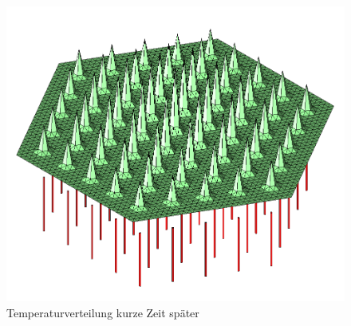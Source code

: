 \documentclass[12pt,a4paper]{article}
\begin{document}
\begin{figure}[h]
\begin{minipage}[t]{.4\linewidth}
       \includegraphics[width=\linewidth]{TempAt5.png}
       \caption{Temperaturverteilung kurze Zeit später}
       \label{TempAt5}
    \end{minipage}
 \end{figure}
\end{document}
